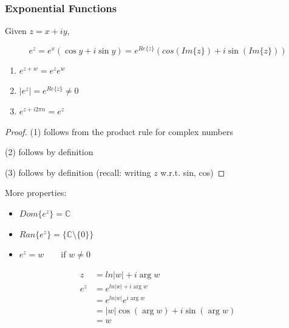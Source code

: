 \documentclass[10pt]{article}
\begin{document}
\subsubsection{Exponential Functions}

\begin{definition}

	Given $ z = x + iy $,

	\begin{equation}
		e^z = e^x (\cos y + i \sin y) = e ^{Re\{z\}}(cos(Im\{z\}) + i \sin(Im\{z\}))
	\end{equation}

	\begin{enumerate}
		\item $ e^{z+w} = e^z e^w $ 
		\item $ |e^{z} | = e^{Re\{z\}} \neq 0  $ 
		\item $e^{z + i 2\pi n } = e^{z} $
	\end{enumerate}
	
	\begin{proof}
		(1) follows from the product rule for complex numbers
	\item (2) follows by definition
	\item (3) follows by definition (recall: writing $ z $ w.r.t. sin, cos)
	\end{proof}
\end{definition}

	More properties:


	\begin{itemize}
		\item $ Dom\{e^z\} = \mathbb{C} $
		\item $ Ran\{e^z\} = \{\mathbb{C} \setminus \{0\}\}$  
		\item $  e^z = w \qquad \text{if } w \neq  0$ 
	\end{itemize}

	\begin{equation}
		\begin{split}
			z &= ln|w| + i \arg w \\
			e^z &=  e^{ln|w| + i \arg w} \\
					&= e^{ln|w|} e^{i \arg w} \\
					&=  |w| \cos(\arg w) + i \sin(\arg w) \\
					&= w \\ 
		\end{split}
	\end{equation}
\end{document}
